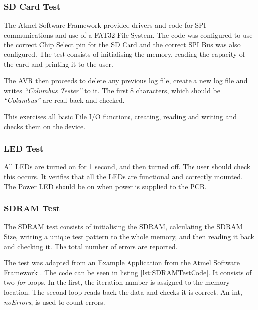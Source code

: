 


\subsubsection{SD Card Test}
The Atmel Software Framework \citep{Atmel:ASF} provided drivers and code for SPI communications and use of a FAT32 File System. The code was configured to use the correct Chip Select pin for the SD Card and the correct SPI Bus was also configured. The test consists of initialising the memory, reading the capacity of the card and printing it to the user. 

The AVR then proceeds to delete any previous log file, create a new log file and writes \textit{``Columbus Tester''} to it. The first 8 characters, which should be \textit{``Columbus''} are read back and checked.


This exercises all basic File I/O functions, creating, reading and writing and checks them on the device.

\subsubsection{LED Test}
All LEDs are turned on for 1 second, and then turned off. The user should check this occurs. It verifies that all the LEDs are functional and correctly mounted. The Power LED should be on when power is supplied to the PCB. 

\subsubsection{SDRAM Test}
The SDRAM test consists of initialising the SDRAM, calculating the SDRAM Size, writing a unique test pattern to the whole memory, and then reading it back and checking it. The total number of errors are reported. 

The test was adapted from an Example Application from the Atmel Software Framework \citep{Atmel:ASF}. The code can be seen in listing \ref{lst:SDRAMTestCode}. It consists of two \textit{for} loops. In the first, the iteration number is assigned to the memory location. The second loop reads back the data and checks it is correct. An int, \textit{noErrors}, is used to count errors. 

